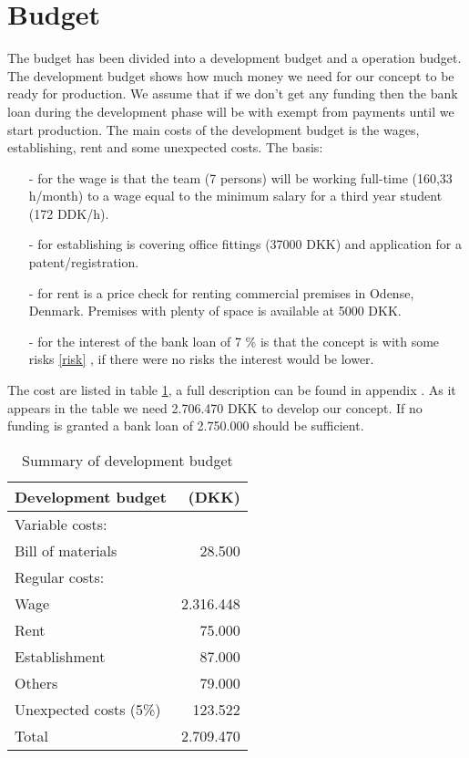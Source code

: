 \section{Budget}
\label{budget_label}
The budget has been divided into a development budget and a operation budget. The development budget  shows how much money we need for our concept to be ready for production. We assume that if we don't get any funding then the bank loan during the development phase will be with exempt from payments until we start production. The main costs of the development budget is the wages, establishing, rent and some unexpected costs. 
The basis: \begin{itemize}
\item[-] for the wage is that the team (7 persons) will be working full-time (160,33 h/month) to a wage equal to the minimum salary for a third year student (172 DDK/h\cite{ida-salary}).
\item[-] for establishing is covering office fittings (37000 DKK) and application for a patent/registration.
\item[-] for rent is a price check for renting commercial premises in Odense, Denmark. Premises with plenty of space is available at 5000 DKK.\cite{rent_prices}
\item[-] for the interest of the bank loan of 7 \% is that the concept is with some risks \ref{risk} , if there were no risks the interest would be lower. 
\end{itemize} 
The cost are listed in table \ref{devbud}, a full description can be found in appendix . As it appears in the table we need 2.706.470 DKK to develop our concept. If no funding is granted a bank loan of 2.750.000 should be sufficient.

\begin{table}[h!]
\centering
\begin{tabular}{l r}
Development budget      & (DKK)\\
\hline                  
Variable costs:         &  \\
Bill of materials       &  28.500  \\
Regular costs:          &  \\
Wage                    &  2.316.448\\
Rent                    &  75.000\\
Establishment           &  87.000\\
Others                  &  79.000\\
Unexpected costs (5\%)  &  123.522\\
\hline                    
Total                   &  2.709.470\\
\end{tabular}
\caption{Summary of development budget}
\label{devbud}
\end{table}

